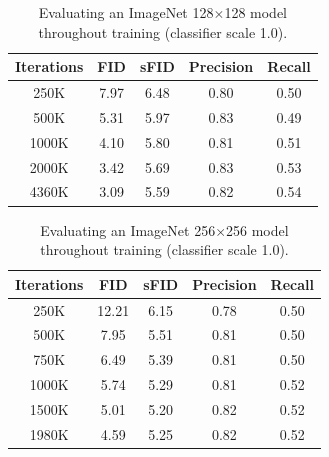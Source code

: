 \documentclass{article}
\begin{document}
\begin{table}[h]
    \begin{center}
    \begin{small}
    \begin{tabular}{ccccc}
    \toprule
    Iterations & FID & sFID & Precision & Recall \\
    \midrule
    250K & 7.97 & 6.48 & 0.80 & 0.50 \\
    500K & 5.31 & 5.97 & 0.83 & 0.49 \\
    1000K & 4.10 & 5.80 & 0.81 & 0.51 \\
    2000K & 3.42 & 5.69 & 0.83 & 0.53 \\
    4360K & 3.09 & 5.59 & 0.82 & 0.54 \\
    \bottomrule
    \end{tabular}
    \end{small}
    \end{center}
    \caption{Evaluating an ImageNet 128$\times$128 model throughout training (classifier scale 1.0).}
    \label{tab:imagenet128early}
    \vskip -0.2in
\end{table}

\begin{table}[h]
    \begin{center}
    \begin{small}
    \begin{tabular}{ccccc}
    \toprule
    Iterations & FID & sFID & Precision & Recall \\
    \midrule
    250K & 12.21 & 6.15 & 0.78 & 0.50 \\
    500K & 7.95 & 5.51 & 0.81 & 0.50 \\
    750K & 6.49 & 5.39 & 0.81 & 0.50 \\
    1000K & 5.74 & 5.29 & 0.81 & 0.52 \\
    1500K & 5.01 & 5.20 & 0.82 & 0.52 \\
    1980K & 4.59 & 5.25 & 0.82  & 0.52 \\
    \bottomrule
    \end{tabular}
    \end{small}
    \end{center}
    \caption{Evaluating an ImageNet 256$\times$256 model throughout training (classifier scale 1.0).}
    \label{tab:imagenet256early}
    \vskip -0.2in
\end{table}
\end{document}

